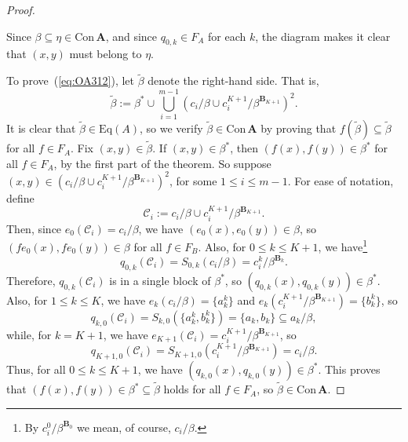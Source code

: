 \documentclass[cm,dissertation,actual,final]{uhthesis}
\theoremstyle{plain}
\theoremstyle{definition}
\theoremstyle{remark}
\numberwithin{theorem}{section}
\numberwithin{claim}{chapter}
\numberwithin{equation}{section}
\numberwithin{conjecture}{chapter}
\newcommand{\<}{\ensuremath{\langle}}
\renewcommand{\>}{\ensuremath{\rangle}}
\renewcommand{\leq}{\ensuremath{\leqslant}}
\newcommand{\Eq}{\ensuremath{\mathrm{Eq}}}
\newcommand{\Con}{\ensuremath{\mathrm{Con\,}}}
\newcommand{\0}{\ensuremath{\mathbf{0}}}
\newcommand{\1}{\ensuremath{\mathbf{1}}}
\newcommand{\2}{\ensuremath{\mathbf{2}}}
\newcommand{\3}{\ensuremath{\mathbf{3}}}
\newcommand{\4}{\ensuremath{\mathbf{4}}}
\newcommand{\5}{\ensuremath{\mathbf{5}}}
\newcommand{\bA}{\ensuremath{\mathbf{A}}}
\newcommand{\bB}{\ensuremath{\mathbf{B}}}
\newcommand{\sC}{\ensuremath{\mathscr{C}}}
\newcommand{\tbeta}{\ensuremath{\widetilde{\beta}}}
\newcommand{\cick}{\ensuremath{\sC_i}}
\newcommand{\CICK}{\ensuremath{c_i/\beta \cup c^{K+1}_i/\beta^{\bB_{K+1}}}}
\begin{document}
\begin{proof}
\begin{center}
  \end{center}
  Since $\beta \subseteq \eta \in \Con\bA$, and since $q_{0,k}\in F_A$ for each
  $k$, the diagram makes it clear that $(x,y)$ must belong to $\eta$.

  To prove~(\ref{eq:OA312}), let $\widetilde{\beta}$ denote the right-hand side.  That
  is,
  \[
  \widetilde{\beta}:= \beta^* \cup \bigcup_{i=1}^{m-1} 
  (c_i/\beta \cup c^{K+1}_i/\beta^{\bB_{K+1}})^2.
  \]
  It is clear that $\tbeta \in \Eq(A)$, so we verify $\widetilde{\beta} \in
  \Con \bA$ by proving that $f(\tbeta) \subseteq \tbeta$ for all $f\in F_A$.
  Fix $(x,y) \in \tbeta$.  If 
  $(x,y) \in \beta^*$, then 
  $(f(x),f(y))\in \beta^*$ for all $f\in F_A$, by the first part of the theorem.
  So suppose 
  $(x,y) \in (\CICK)^2$, 
  for some $1\leq i \leq m-1$.
  For ease of notation, define
  \[
  \cick := \CICK.
  \]
  Then, since
  $e_0(\cick) = c_i/\beta$, we have
  $(e_0(x), e_0(y))\in \beta$, so
  $(fe_0(x), fe_0(y))\in \beta$ for all $f\in F_B$.
  Also, for $0\leq k\leq K+1$, we 
  have\footnote{By $c_i^{0}/\beta^{\bB_{0}}$ we mean, of course, $c_i/\beta$.}
  \[
  q_{0,k}(\cick) = S_{0,k}(c_i/\beta) = 
  c_i^{k}/\beta^{\bB_{k}}.
  \]
  Therefore,
  $q_{0,k}(\cick)$ is in a single block of $\beta^*$, so 
  $(q_{0,k}(x), q_{0,k}(y)) \in \beta^*$.
  Also, for $1\leq k \leq K$, we have 
  $e_k(c_i/\beta) = \{a_k^k\}$ and 
  $e_k(c_i^{K+1}/\beta^{\bB_{K+1}})= \{b_k^k\}$, so 
  \[
  q_{k,0}(\cick) = S_{k,0}(\{a_k^k, b_k^k\}) = \{a_k, b_k\} \subseteq a_k/\beta,
  \]
  while, for $k=K+1$, we have 
  $e_{K+1}(\cick) = c_i^{K+1}/\beta^{\bB_{K+1}}$, so 
  \[
  q_{K+1,0}(\cick) = S_{K+1,0}(c_i^{K+1}/\beta^{\bB_{K+1}}) = c_i/\beta.
  \]
  Thus, for all $0\leq k \leq K+1$, we have 
  $(q_{k,0}(x), q_{k,0}(y)) \in \beta^*$.
  This proves that
  $(f(x),f(y))\in \beta^*\subseteq \tbeta$ holds for all $f\in F_A$, so $\tbeta
  \in \Con \bA$.


\end{proof}
\end{document}
